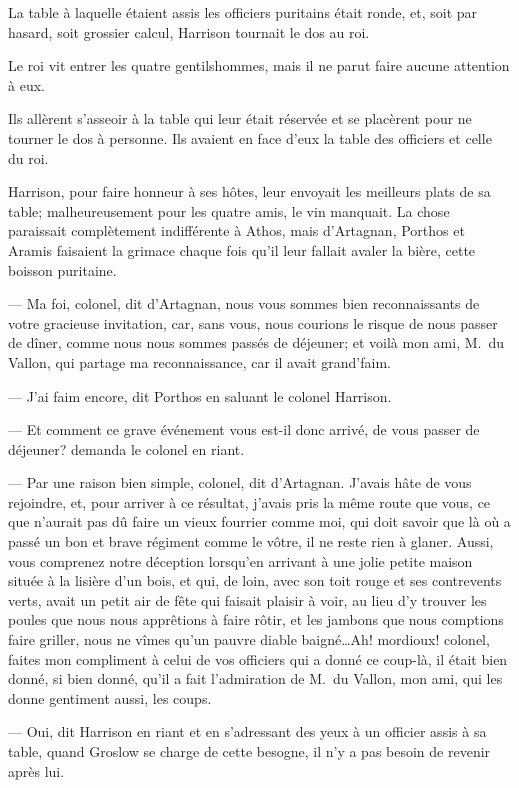 La table à laquelle étaient assis les officiers puritains était ronde, et, soit par hasard, soit grossier calcul, Harrison tournait le dos au roi.

Le roi vit entrer les quatre gentilshommes, mais il ne parut faire aucune attention à eux.

Ils allèrent s'asseoir à la table qui leur était réservée et se placèrent pour ne tourner le dos à personne. Ils avaient en face d'eux la table des officiers et celle du roi.

Harrison, pour faire honneur à ses hôtes, leur envoyait les meilleurs plats de sa table; malheureusement pour les quatre amis, le vin manquait. La chose paraissait complètement indifférente à Athos, mais d'Artagnan, Porthos et Aramis faisaient la grimace chaque fois qu'il leur fallait avaler la bière, cette boisson puritaine.

— Ma foi, colonel, dit d'Artagnan, nous vous sommes bien reconnaissants de votre gracieuse invitation, car, sans vous, nous courions le risque de nous passer de dîner, comme nous nous sommes passés de déjeuner; et voilà mon ami, M.~du Vallon, qui partage ma reconnaissance, car il avait grand'faim.

— J'ai faim encore, dit Porthos en saluant le colonel Harrison.

— Et comment ce grave événement vous est-il donc arrivé, de vous passer de déjeuner? demanda le colonel en riant.

— Par une raison bien simple, colonel, dit d'Artagnan. J'avais hâte de vous rejoindre, et, pour arriver à ce résultat, j'avais pris la même route que vous, ce que n'aurait pas dû faire un vieux fourrier comme moi, qui doit savoir que là où a passé un bon et brave régiment comme le vôtre, il ne reste rien à glaner. Aussi, vous comprenez notre déception lorsqu'en arrivant à une jolie petite maison située à la lisière d'un bois, et qui, de loin, avec son toit rouge et ses contrevents verts, avait un petit air de fête qui faisait plaisir à voir, au lieu d'y trouver les poules que nous nous apprêtions à faire rôtir, et les jambons que nous comptions faire griller, nous ne vîmes qu'un pauvre diable baigné\dots Ah! mordioux! colonel, faites mon compliment à celui de vos officiers qui a donné ce coup-là, il était bien donné, si bien donné, qu'il a fait l'admiration de M.~du Vallon, mon ami, qui les donne gentiment aussi, les coups.

— Oui, dit Harrison en riant et en s'adressant des yeux à un officier assis à sa table, quand Groslow se charge de cette besogne, il n'y a pas besoin de revenir après lui.

